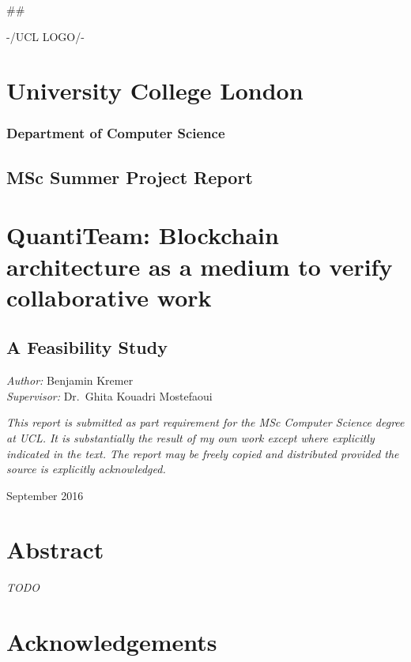 \documentclass[12pt]{report}
\date{}
\begin{document}
\#\#

-/UCL LOGO/-

\section{University College London}\label{university-college-london}

\subsubsection{Department of Computer
Science}\label{department-of-computer-science}

\subsection{MSc Summer Project Report}\label{msc-summer-project-report}

\section{QuantiTeam: Blockchain architecture as a medium to verify
collaborative
work}\label{quantiteam-blockchain-architecture-as-a-medium-to-verify-collaborative-work}

\subsection{A Feasibility Study}\label{a-feasibility-study}

\emph{Author:} Benjamin Kremer\\
\emph{Supervisor:} Dr.~Ghita Kouadri Mostefaoui

\emph{This report is submitted as part requirement for the MSc Computer
Science degree at UCL. It is substantially the result of my own work
except where explicitly indicated in the text. The report may be freely
copied and distributed provided the source is explicitly acknowledged.}

September 2016


\section{Abstract}\label{abstract}

\emph{TODO}

\section{Acknowledgements}\label{acknowledgements}
\end{document}
